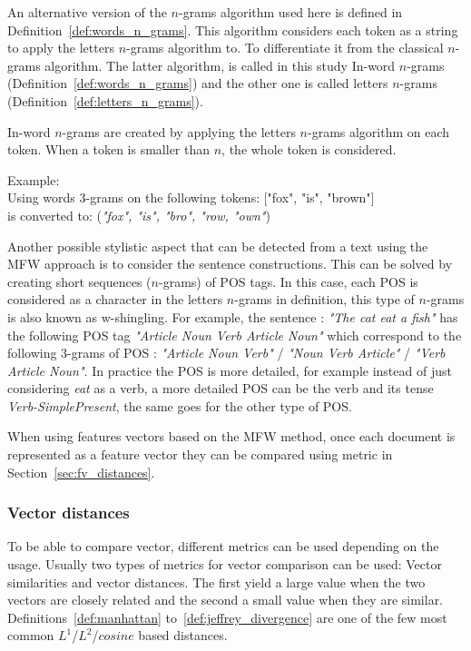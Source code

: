 An alternative version of the $n$-grams algorithm used here is defined in Definition~\ref{def:words_n_grams}.
This algorithm considers each token as a string to apply the letters $n$-grams algorithm to.
To differentiate it from the classical $n$-grams algorithm.
The latter algorithm, is called in this study In-word $n$-grams (Definition~\ref{def:words_n_grams}) and the other one is called letters $n$-grams (Definition~\ref{def:letters_n_grams}).

\begin{definition}
  \label{def:words_n_grams}
  In-word $n$-grams are created by applying the letters $n$-grams algorithm on each token.
  When a token is smaller than $n$, the whole token is considered.

  Example: \\
  Using words 3-grams on the following tokens: ["fox", "is", "brown"] \\
  is converted to: (\textit{"fox", "is", "bro", "row, "own"})
\end{definition}

Another possible stylistic aspect that can be detected from a text using the MFW approach is to consider the sentence constructions.
This can be solved by creating short sequences ($n$-grams) of POS tags.
In this case, each POS is considered as a character in the letters $n$-grams in definition, this type of $n$-grams is also known as w-shingling.
For example, the sentence : \textit{"The cat eat a fish"} has the following POS tag \textit{"Article Noun Verb Article Noun"} which correspond to the following 3-grams of POS : \textit{"Article Noun Verb"} / \textit{"Noun Verb Article"} / \textit{"Verb Article Noun"}.
In practice the POS is more detailed, for example instead of just considering \textit{eat} as a verb, a more detailed POS can be the verb and its tense \textit{Verb-SimplePresent}, the same goes for the other type of POS.

When using features vectors based on the MFW method, once each document is represented as a feature vector they can be compared using metric in Section~\ref{sec:fv_distances}.

\subsubsection{Vector distances \label{sec:fv_distances}}

To be able to compare vector, different metrics can be used depending on the usage.
Usually two types of metrics for vector comparison can be used: Vector similarities and vector distances.
The first yield a large value when the two vectors are closely related and the second a small value when they are similar.
Definitions~\ref{def:manhattan} to~\ref{def:jeffrey_divergence} are one of the few most common $L^1$/$L^2$/$cosine$ based distances.

